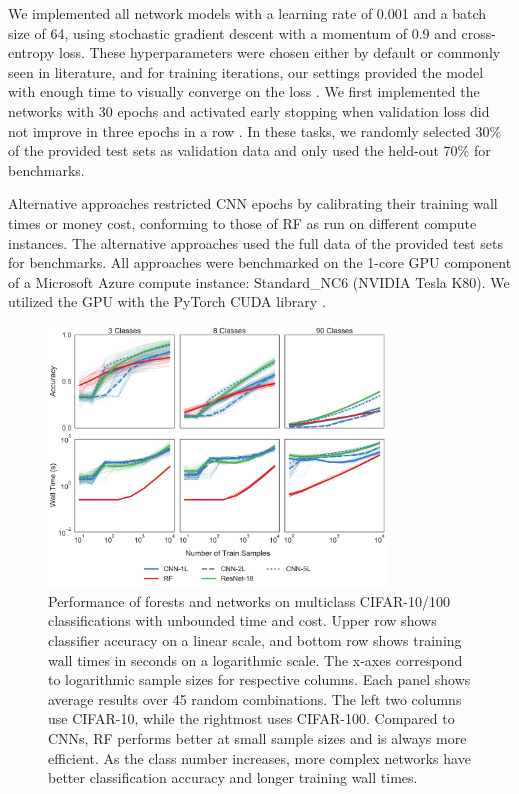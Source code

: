 We implemented all network models with a learning rate of 0.001 and a batch size of 64, using stochastic gradient descent with a momentum of 0.9 and cross-entropy loss. These hyperparameters were chosen either by default or commonly seen in literature, and for training iterations, our settings provided the model with enough time to visually converge on the loss \citep{Krizhevsky2012-sq, pmlr-v119-rice20a}.
We first implemented the networks with 30 epochs and activated early stopping when validation loss did not improve in three epochs in a row \citep{li2020, lutz, caruana}. In these tasks, we randomly selected 30\% of the provided test sets as validation data and only used the held-out 70\% for benchmarks.

Alternative approaches restricted CNN epochs by calibrating their training wall times or money cost, conforming to those of RF as run on different compute instances. The alternative approaches used the full data of the provided test sets for benchmarks. All approaches were benchmarked on the 1-core GPU component of a Microsoft Azure compute instance: Standard\_NC6 (NVIDIA Tesla K80).
We utilized the GPU with the PyTorch CUDA library \citep{pytorch}.

\begin{figure}[htb]
\centering
\includegraphics[width=0.8\textwidth]{figures/cifar}
  \caption{Performance of forests and networks on multiclass CIFAR-10/100 classifications with unbounded time and cost.
  Upper row shows classifier accuracy on a linear scale, and bottom row shows training wall times in seconds on a logarithmic scale. The x-axes correspond to logarithmic sample sizes for respective columns. Each panel shows average results over 45 random combinations. The left two columns use CIFAR-10, while the rightmost uses CIFAR-100.
  Compared to CNNs, RF performs better at small sample sizes and is always more efficient. As the class number increases, more complex networks have better classification accuracy and longer training wall times.
  }
\label{fig:cifar}
\end{figure}

